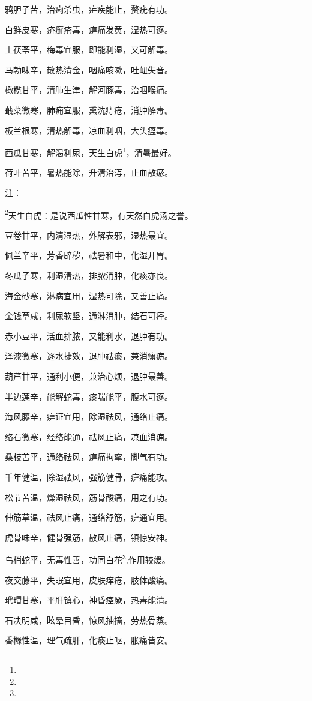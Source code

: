 \documentclass[a4paper,12pt,UTF8,twoside]{ctexbook}
\begin{document}
鸦胆子苦，治痢杀虫，疟疾能止，赘疣有功。

白鲜皮寒，疥癣疮毒，痹痛发黄，湿热可逐。

土茯苓平，梅毒宜服，即能利湿，又可解毒。

马勃味辛，散热清金，咽痛咳嗽，吐衄失音。

橄榄甘平，清肺生津，解河豚毒，治咽喉痛。

蕺菜微寒，肺痈宜服，熏洗痔疮，消肿解毒。

板兰根寒，清热解毒，凉血利咽，大头瘟毒。

西瓜甘寒，解渴利尿，天生白虎\footnote{}，清暑最好。

荷叶苦平，暑热能除，升清治泻，止血散瘀。

注：

\footnote{}天生白虎：是说西瓜性甘寒，有天然白虎汤之誉。

豆卷甘平，内清湿热，外解表邪，湿热最宜。

佩兰辛平，芳香辟秽，祛暑和中，化湿开胃。

冬瓜子寒，利湿清热，排脓消肿，化痰亦良。

海金砂寒，淋病宜用，湿热可除，又善止痛。

金钱草咸，利尿软坚，通淋消肿，结石可痊。

赤小豆平，活血排脓，又能利水，退肿有功。

泽漆微寒，逐水捷效，退肿祛痰，兼消瘰疬。

葫芦甘平，通利小便，兼治心烦，退肿最善。

半边莲辛，能解蛇毒，痰喘能平，腹水可逐。

海风藤辛，痹证宜用，除湿祛风，通络止痛。

络石微寒，经络能通，祛风止痛，凉血消痈。

桑枝苦平，通络祛风，痹痛拘挛，脚气有功。

千年健温，除湿祛风，强筋健骨，痹痛能攻。

松节苦温，燥湿祛风，筋骨酸痛，用之有功。

伸筋草温，祛风止痛，通络舒筋，痹通宜用。

虎骨味辛，健骨强筋，散风止痛，镇惊安神。

乌梢蛇平，无毒性善，功同白花\footnote{},作用较缓。

夜交藤平，失眠宜用，皮肤痒疮，肢体酸痛。

玳瑁甘寒，平肝镇心，神昏痉厥，热毒能清。

石决明咸，眩晕目昏，惊风抽搐，劳热骨蒸。

香橼性温，理气疏肝，化痰止呕，胀痛皆安。
\end{document}
